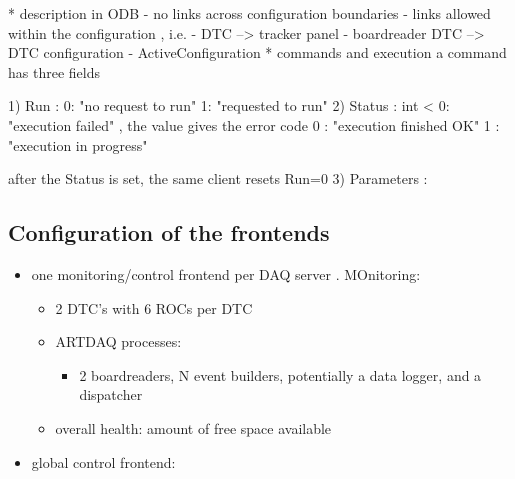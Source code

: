* description in ODB                                                         
- no links across configuration boundaries
- links allowed within the configuration , i.e.
  - DTC --> tracker panel
  - boardreader DTC --> DTC configuration
- ActiveConfiguration
* commands and execution
 a command has three fields
 
1) Run     : 0: "no request to run"  1: "requested to run" 
2) Status  : int
   < 0: "execution failed" , the value gives the error code
   0  : "execution finished OK"
   1  : "execution in progress"

   after the Status is set, the same client resets Run=0
3) Parameters :


\subsection{Configuration of the frontends}

\begin{itemize}
\item
  one monitoring/control frontend per DAQ server . MOnitoring:
  \begin{itemize}
  \item
    2 DTC's with 6 ROCs per DTC
  \item
    ARTDAQ processes:
    \begin{itemize}
    \item
      2 boardreaders, N event builders, potentially a data logger, and a dispatcher
    \end{itemize}
  \item
    overall health: amount of free space available
  \end{itemize}
\item
  global control frontend:
\end{itemize}

